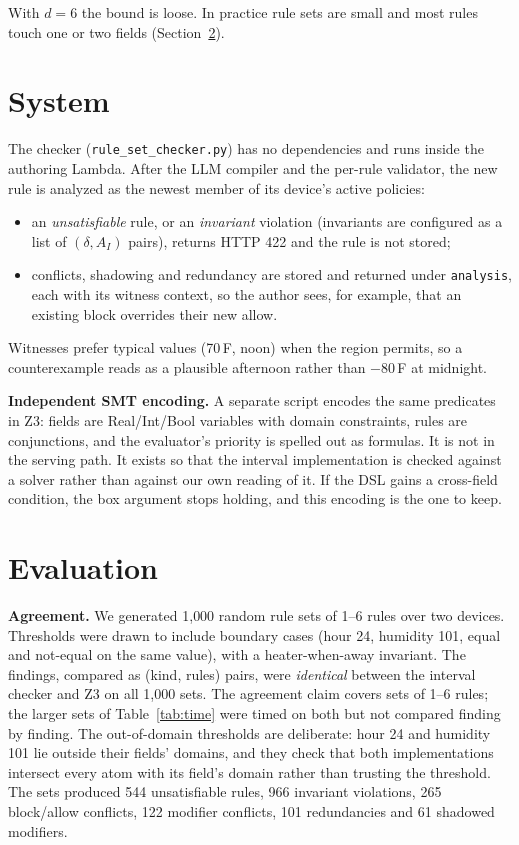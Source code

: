 \documentclass[conference]{IEEEtran}
\theoremstyle{definition}
\begin{document}
With $d=6$ the bound is loose. In practice rule sets are small and most rules touch one or two fields (Section~\ref{sec:eval}).

\section{System}\label{sec:system}
The checker (\texttt{rule\_set\_checker.py}) has no dependencies and runs inside the authoring Lambda. After the LLM compiler and the per-rule validator, the new rule is analyzed as the newest member of its device's active policies:
\begin{itemize}
\item an \emph{unsatisfiable} rule, or an \emph{invariant} violation (invariants are configured as a list of $(\delta,A_I)$ pairs), returns HTTP 422 and the rule is not stored;
\item conflicts, shadowing and redundancy are stored and returned under \texttt{analysis}, each with its witness context, so the author sees, for example, that an existing block overrides their new allow.
\end{itemize}
Witnesses prefer typical values (70\,\textdegree F, noon) when the region permits, so a counterexample reads as a plausible afternoon rather than $-80$\,\textdegree F at midnight.

\textbf{Independent SMT encoding.} A separate script encodes the same predicates in Z3: fields are Real/Int/Bool variables with domain constraints, rules are conjunctions, and the evaluator's priority is spelled out as formulas. It is not in the serving path. It exists so that the interval implementation is checked against a solver rather than against our own reading of it. If the DSL gains a cross-field condition, the box argument stops holding, and this encoding is the one to keep.

\section{Evaluation}\label{sec:eval}
\textbf{Agreement.} We generated 1{,}000 random rule sets of 1--6 rules over two devices. Thresholds were drawn to include boundary cases (hour 24, humidity 101, equal and not-equal on the same value), with a heater-when-away invariant. The findings, compared as (kind, rules) pairs, were \emph{identical} between the interval checker and Z3 on all 1{,}000 sets. The agreement claim covers sets of 1--6 rules; the larger sets of Table~\ref{tab:time} were timed on both but not compared finding by finding. The out-of-domain thresholds are deliberate: hour 24 and humidity 101 lie outside their fields' domains, and they check that both implementations intersect every atom with its field's domain rather than trusting the threshold. The sets produced 544 unsatisfiable rules, 966 invariant violations, 265 block/allow conflicts, 122 modifier conflicts, 101 redundancies and 61 shadowed modifiers.
\end{document}
